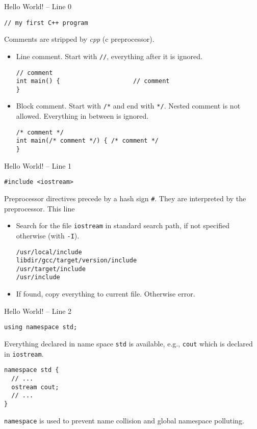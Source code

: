 \documentclass[presentation]{beamer}
\begin{document}
\begin{frame}[fragile,label={sec:orgheadline3}]{Hello World! -- Line 0}
 \begin{verbatim}
// my first C++ program
\end{verbatim}

Comments are stripped by \emph{cpp} (c preprocessor).

\begin{itemize}
\item Line comment.  Start with \texttt{//}, everything after it is ignored.

\begin{verbatim}
// comment
int main() {                    // comment
}
\end{verbatim}

\item Block comment.  Start with \texttt{/*} and end with \texttt{*/}.  Nested
comment is not allowed.  Everything in between is ignored.

\begin{verbatim}
/* comment */
int main(/* comment */) { /* comment */
}
\end{verbatim}
\end{itemize}
\end{frame}

\begin{frame}[fragile,label={sec:orgheadline4}]{Hello World! -- Line 1}
 \begin{verbatim}
#include <iostream>
\end{verbatim}

Preprocessor directives precede by a hash sign \texttt{\#}.  They are
interpreted by the preprocessor. This line

\begin{itemize}
\item Search for the file \texttt{iostream} in standard search path, if not
specified otherwise (with \texttt{-I}).

\begin{verbatim}
/usr/local/include
libdir/gcc/target/version/include
/usr/target/include
/usr/include
\end{verbatim}

\item If found, copy everything to current file.  Otherwise error.
\end{itemize}
\end{frame}

\begin{frame}[fragile,label={sec:orgheadline5}]{Hello World! -- Line 2}
 \begin{verbatim}
using namespace std;
\end{verbatim}

Everything declared in name space \texttt{std} is available, e.g., \texttt{cout}
which is declared in \texttt{iostream}.

\begin{verbatim}
namespace std {
  // ...
  ostream cout;
  // ...
}
\end{verbatim}

\texttt{namespace} is used to prevent name collision and global namespace
polluting.
\end{frame}
\end{document}
